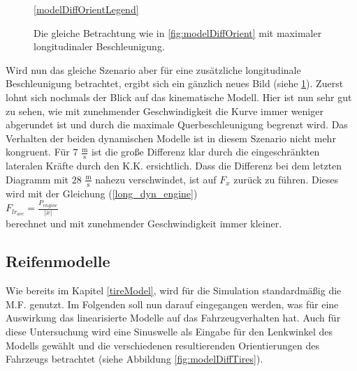 \documentclass{like}
\begin{document}
\begin{figure}
	\centering
	\subfigure{
		 
	}%
	\subfigure{
		 
	}	
	\ref{modelDiffOrientLegend}
	\caption{Die gleiche Betrachtung wie in \ref{fig:modelDiffOrient} mit maximaler longitudinaler Be\-schleu\-ni\-gung.}\label{fig:modelDiffOrientMaxAcc}
\end{figure}

Wird nun das gleiche Szenario aber für eine zusätzliche longitudinale Beschleunigung betrachtet, ergibt sich ein gänzlich neues Bild (siehe \ref{fig:modelDiffOrientMaxAcc}).
Zuerst lohnt sich nochmals der Blick auf das kinematische Modell. Hier ist nun sehr gut zu sehen, wie mit zunehmender Geschwindigkeit die Kurve immer weniger abgerundet ist und durch die maximale Querbeschleunigung begrenzt wird. Das Verhalten der beiden dynamischen Modelle ist in diesem Szenario nicht mehr kongruent. Für $7$ $\frac{\text{m}}{\text{s}}$ ist die große Differenz klar durch die eingeschränkten lateralen Kräfte durch den \ac{K.K.} ersichtlich. Dass die Differenz bei dem letzten Diagramm mit $28$ $\frac{\text{m}}{\text{s}}$ nahezu verschwindet, ist auf $F_x$ zurück zu führen. Dieses wird mit der Gleichung (\ref{long_dyn_engine}) \\ 
$F_{lr_{acc}} = \frac{P_{engine}}{|\dot{x}|}$\\
berechnet und mit zunehmender Geschwindigkeit immer kleiner. 


\subsection{Reifenmodelle}
Wie bereits im Kapitel \ref{tireModel}, wird für die Simulation standardmäßig die \ac{M.F.} genutzt. Im Folgenden soll nun darauf eingegangen werden, was für eine Auswirkung das linearisierte  Modelle auf das Fahrzeugverhalten hat. Auch für diese Untersuchung wird eine Sinuswelle als Eingabe für den Lenkwinkel des Modells gewählt und die verschiedenen resultierenden Orientierungen des Fahrzeugs betrachtet (siehe Abbildung \ref{fig:modelDiffTires}).
\end{document}
